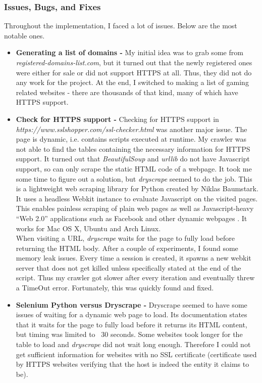 \documentclass[a4paper, 12pt, titlepage]{article}
\begin{document}
\subsubsection{Issues, Bugs, and Fixes}
Throughout the implementation, I faced a lot of issues. Below are the most notable ones.

\begin{itemize}
\item{\textbf{Generating a list of domains - }My initial idea was to grab some from \textit{registered-domains-list.com}, but it turned out that the newly registered ones were either for sale or did not support HTTPS at all. Thus, they did not do any work for the project. At the end, I switched to making a list of gaming related websites - there are thousands of that kind, many of which have HTTPS support.}
\item{\textbf{Check for HTTPS support - }Checking for HTTPS support in \textit{https://www.sslshopper.com/ssl-checker.html} was another major issue. The page is dynamic, i.e. contains scripts executed at runtime. My crawler was not able to find the tables containing the necessary information for HTTPS support. It turned out that \textit{BeautifulSoup} and \textit{urllib} do not have Javascript support, so can only scrape the static HTML code of a webpage. It took me some time to figure out a solution, but \textit{dryscrape} seemed to do the job. This is a lightweight web scraping library for Python created by Niklas Baumstark. It uses a headless Webkit instance to evaluate Javascript on the visited pages. This enables painless scraping of plain web pages as well as Javascript-heavy “Web 2.0” applications such as Facebook and other dynamic webpages \cite{DryScrape}. It works for Mac OS X, Ubuntu and Arch Linux. \\[6pt]
When visiting a URL, \textit{dryscrape} waits for the page to fully load before returning the HTML body. After a couple of experiments, I found some memory leak issues. Every time a session is created, it spawns a new webkit server that does not get killed unless specifically stated at the end of the script. Thus my crawler got slower after every iteration and eventually threw a TimeOut error. Fortunately, this was quickly found and fixed.}
\item{\textbf{Selenium Python versus Dryscrape - }Dryscrape seemed to have some issues of waiting for a dynamic web page to load. Its documentation states that it waits for the page to fully load before it returns its HTML content, but timing was limited to ~30 seconds. Some websites took longer for the table to load and \textit{dryscrape} did not wait long enough. Therefore I could not get sufficient information for websites with no SSL certificate (certificate used by HTTPS websites verifying that the host is indeed the entity it claims to be). \\[6pt]
}
\end{itemize}
\end{document}
